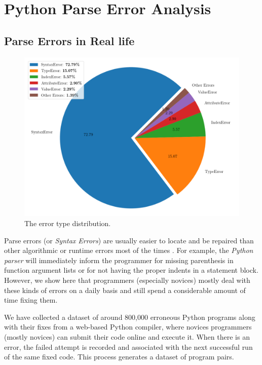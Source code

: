 \section{Python Parse Error Analysis}
\label{sec:error-analysis}

\subsection{Parse Errors in Real life}
\label{sec:error-analysis:syntax}

\begin{figure}[h]
  \centering
  \includegraphics[width=0.8\linewidth]{error-statistics.png}
  \caption{The error type distribution.}
  \label{fig:error-statistics}
\end{figure}

Parse errors (or \emph{Syntax Errors}) are usually easier to locate and be
repaired than other algorithmic or runtime errors most of the times \citep{?}.
For example, the \emph{Python parser} will immediately inform the programmer for
missing parenthesis in function argument lists or for not having the proper
indents in a statement block. However, we show here that programmers (especially
novices) mostly deal with these kinds of errors on a daily basis and still spend
a considerable amount of time fixing them.

We have collected a dataset of around 800,000 erroneous Python programs along
with their fixes from a web-based Python compiler, where novices programmers
(mostly novices) can submit their code online and execute it. When there is an
error, the failed attempt is recorded and associated with the next successful
run of the same fixed code. This process generates a dataset of program pairs.

